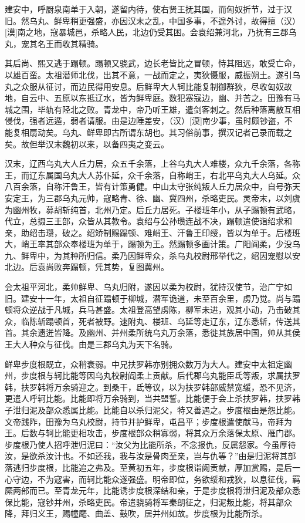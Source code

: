 \documentclass[12pt,UTF8]{ctexbook}
\begin{document}
建安中，呼厨泉南单于入朝，遂留内待，使右贤王抚其国，而匈奴折节，过于汉旧。然乌丸、鲜卑稍更强盛，亦因汉末之乱，中国多事，不遑外讨，故得擅（汉）[漠]南之地，寇暴城邑，杀略人民，北边仍受其困。会袁绍兼河北，乃抚有三郡乌丸，宠其名王而收其精骑。

其后尚、熙又逃于蹋顿。蹋顿又骁武，边长老皆比之冒顿，恃其阻远，敢受亡命，以雄百蛮。太祖潜师北伐，出其不意，一战而定之，夷狄慑服，威振朔土。遂引乌丸之众服从征讨，而边民得用安息。后鲜卑大人轲比能复制御群狄，尽收匈奴故地，自云中、五原以东抵辽水，皆为鲜卑庭。数犯塞寇边，幽、并苦之。田豫有马城之围，毕轨有陉北之败。青龙中，帝乃听王雄，遣剑客刺之。然后种落离散互相侵伐，强者远遁，弱者请服。由是边陲差安，（汉）[漠]南少事，虽时颇钞盗，不能复相扇动矣。乌丸、鲜卑即古所谓东胡也。其习俗前事，撰汉记者己录而载之矣。故但举汉末魏初以来，以备四夷之变云。

汉末，辽西乌丸大人丘力居，众五千余落，上谷乌丸大人难楼，众九千余落，各称王，而辽东属国乌丸大人苏仆延，众千余落，自称峭王，右北平乌丸大人乌延。众八百余落，自称汗鲁王，皆有计策勇健。中山太守张纯叛人丘力居众中，自号弥天安定王，为三郡乌丸元帅，寇略青、徐、幽、冀四州，杀略吏民。灵帝末，以刘虞为幽州牧，募胡斩纯首，北州乃定。后丘力居死。子楼班年小，从子蹋顿有武略，代立，总摄三王部，众皆从其教令。袁绍与公孙瓒连战不决，蹋顿遣使诣绍求和亲，助绍击瓒，破之。绍矫制赐蹋顿、难峭王、汗鲁王印绶，皆以为单于。后楼班大，峭王率其部众奉楼班为单于，蹋顿为王。然蹋顿多画计策。广阳阎柔，少没乌九、鲜卑中，为其种所归信。柔乃因鲜卑众，杀乌丸校尉邢举代之，绍因宠慰以安北边。后袁尚败奔蹋顿，凭其势，复图冀州。

会太祖平河北，柔帅鲜卑、乌丸归附，遂因以柔为校尉，犹持汉使节，治广宁如旧。建安十一年，太祖自征蹋顿于柳城，潜军诡道，未至百余里，虏乃觉。尚与蹋顿将众逆战于凡城，兵马甚盛。太祖登高望虏陈，柳军未进，观其小动，乃击破其众，临陈斩蹋顿首，死者被野。速附丸、楼班、乌延等走辽东，辽东悉斩，传送其首。其余遗迸皆降。及幽州、并州柔所统乌丸万余落，悉徙其族居中国，帅从其侯王大人种众与征伐。由是三郡乌丸为天下名骑。

鲜卑步度根既立，众稍衰弱。中兄扶罗韩亦别拥众数万为大人。建安中太祖定幽州，步度根与轲比能等因乌丸校尉阎柔上贡献。后代郡乌丸能臣氐等叛，求属扶罗韩，扶罗韩将万余骑迎之。到桑干，氐等议，以为扶罗韩部威禁宽缓，恐不见济，更遣人呼轲比能。比能即将万余骑到，当共盟誓。比能便于会上杀扶罗韩，扶罗韩子泄归泥及部众悉属比能。比能自以杀归泥父，特又善遇之。步度根由是怨比能。文帝践阼，田豫为乌丸校尉，持节并护鲜卑，屯昌平；步度根遣使献马，帝拜为王。后数与轲比能更相攻击，步度根部众稍寡弱，将其众万余落保太原、雁门郡。步度根乃使人招呼泄归泥曰：“汝父为比能所杀，不念报仇，反属怨家。今虽厚待汝，是欲杀汝计也。不如还我，我与汝是骨肉至亲，岂与仇等？”由是归泥将其部落逃归步度根，比能追之弗及。至黄初五年，步度根诣阙贡献，厚加赏赐，是后一心守边，不为寇害，而轲比能众遂强盛。明帝即位，务欲绥和戎狄，以息征伐，羁縻两部而已。至青龙元年，比能诱步度根深结和亲，于是步度根将泄归泥及部众悉保比能，寇钞并州，杀略吏民。帝遣骁骑将军秦朗征之，归泥叛比能，将其部众降，拜归义王，赐幢麾、曲盖、鼓吹，居并州如故。步度根为比能所杀。
\end{document}
